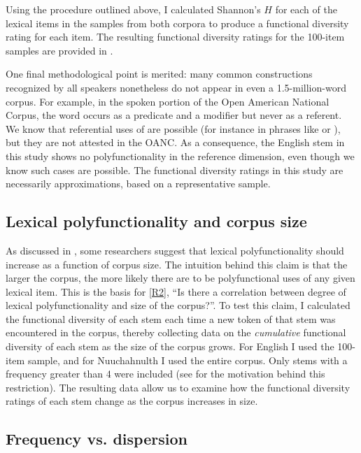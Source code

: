 Using the procedure outlined above, I calculated Shannon's $H$ for each of the lexical items in the samples from both corpora to produce a functional diversity rating for each item. The resulting functional diversity ratings for the 100-item samples are provided in .

One final methodological point is merited: many common constructions recognized by all speakers nonetheless do not appear in even a 1.5-million-word corpus. For example, in the spoken portion of the Open American National Corpus, the word  occurs as a predicate and a modifier but never as a referent. We know that referential uses of  are possible (for instance in phrases like  or ), but they are not attested in the OANC. As a consequence, the English stem  in this study shows no polyfunctionality in the reference dimension, even though we know such cases are possible. The functional diversity ratings in this study are necessarily approximations, based on a representative sample.

\subsection{Lexical polyfunctionality and corpus size}
\label{sec:3.4.2}

As discussed in , some researchers suggest that lexical polyfunctionality should increase as a function of corpus size. The intuition behind this claim is that the larger the corpus, the more likely there are to be polyfunctional uses of any given lexical item. This is the basis for \ref{R2}, \enquote{Is there a correlation between degree of lexical polyfunctionality and size of the corpus?}. To test this claim, I calculated the functional diversity of each stem each time a new token of that stem was encountered in the corpus, thereby collecting data on the \emph{cumulative} functional diversity of each stem as the size of the corpus grows. For English I used the 100-item sample, and for Nuuchahnulth I used the entire corpus. Only stems with a frequency greater than 4 were included (see  for the motivation behind this restriction). The resulting data allow us to examine how the functional diversity ratings of each stem change as the corpus increases in size.

\subsection{Frequency vs. dispersion}
\label{sec:3.4.3}

